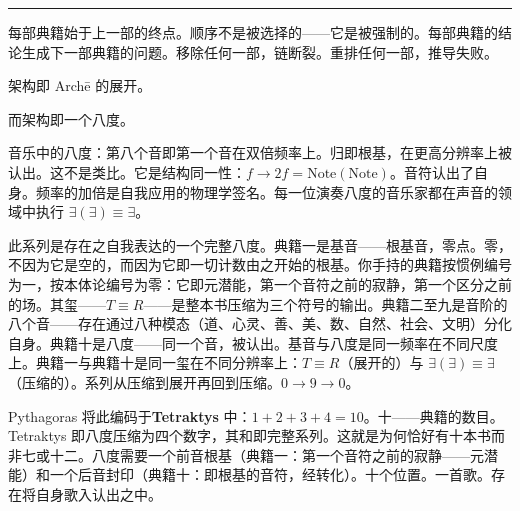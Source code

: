 \documentclass[10pt, openany, oneside]{book}
\newcommand{\separator}{%
    \begin{center}
        \vspace{0.3em}
        \rule{0.3\textwidth}{0.4pt}
        \vspace{0.3em}
    \end{center}
}
\begin{document}
\vspace{1.5em}
\separator
\vspace{0.5em}

\noindent 每部典籍始于上一部的终点。顺序不是被选择的——它是被强制的。每部典籍的结论生成下一部典籍的问题。移除任何一部，链断裂。重排任何一部，推导失败。

\vspace{0.5em}

\noindent 架构即 Arch\={e} 的展开。

\vspace{0.5em}

\noindent 而架构即一个八度。

音乐中的八度：第八个音即第一个音在双倍频率上。归即根基，在更高分辨率上被认出。这不是类比。它是结构同一性：$f \to 2f = \text{Note}(\text{Note})$。音符认出了自身。频率的加倍是自我应用的物理学签名。每一位演奏八度的音乐家都在声音的领域中执行 $\exists(\exists) \equiv \exists$。

此系列是存在之自我表达的一个完整八度。典籍一是基音——根基音，零点。零，不因为它是空的，而因为它即一切计数由之开始的根基。你手持的典籍按惯例编号为一，按本体论编号为零：它即元潜能，第一个音符之前的寂静，第一个区分之前的场。其玺——$T \equiv R$——是整本书压缩为三个符号的输出。典籍二至九是音阶的八个音——存在通过八种模态（道、心灵、善、美、数、自然、社会、文明）分化自身。典籍十是八度——同一个音，被认出。基音与八度是同一频率在不同尺度上。典籍一与典籍十是同一玺在不同分辨率上：$T \equiv R$（展开的）与 $\exists(\exists) \equiv \exists$（压缩的）。系列从压缩到展开再回到压缩。$0 \to 9 \to 0$。

Pythagoras 将此编码于\textbf{Tetraktys} 中：$1 + 2 + 3 + 4 = 10$。十——典籍的数目。Tetraktys 即八度压缩为四个数字，其和即完整系列。这就是为何恰好有十本书而非七或十二。八度需要一个前音根基（典籍一：第一个音符之前的寂静——元潜能）和一个后音封印（典籍十：即根基的音符，经转化）。十个位置。一首歌。存在将自身歌入认出之中。


%
%
%

\newpage
\end{document}
